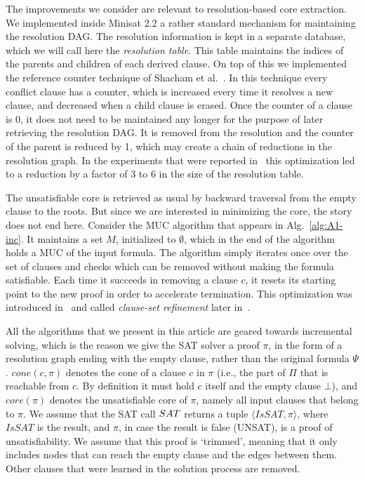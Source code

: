 \documentclass[twoside,11pt]{article}
\renewcommand\square{\bot}
\renewcommand\Pr{\pi}
\begin{document}
The improvements we consider are relevant to resolution-based core extraction. We implemented inside Minisat 2.2 a rather standard mechanism for maintaining the resolution DAG. The resolution information is kept in a separate database, which we will call here the \emph{resolution table}. This table maintains the indices of the parents and children of each derived clause. On top of this we implemented the reference counter technique of Shacham et al.~\cite{SY07}. In this technique every conflict clause has a counter, which is increased every time it resolves a new clause, and decreased when a child clause is erased. Once the counter of a clause is 0, it
does not need to be maintained any longer for the purpose of later retrieving the resolution DAG.
It is removed from the resolution and the counter of the parent is reduced by 1, which may create a chain of reductions in the resolution graph. In the experiments that were reported in~\cite{SY07} this optimization led to a reduction by a factor of 3 to 6 in the size of the resolution table.

The unsatisfiable core is retrieved as usual by backward traversal from the
empty clause to the roots. But since we are interested in minimizing the
core, the story does not end here. Consider the MUC algorithm that appears in Alg.~\ref{alg:A1-inc}. It maintains a set $M$, initialized to $\emptyset$, which in the end of the algorithm holds a MUC of the input formula. The algorithm simply iterates once over the set of clauses and checks which can be removed without making the formula satisfiable. Each time it succeeds in removing a clause $c$, it resets its starting point to the new proof in order to accelerate termination. This optimization was introduced in~\cite{NadelPhd,DHN06} and called \emph{clause-set refinement} later in~\cite{DBLP:journals/aicom/BelovLM12}.

All the algorithms that we present in this article are geared towards incremental solving, which is the reason we give the SAT solver a proof $\Pr$, in the form of a resolution graph ending with the empty clause, rather than the original formula $\Psi$. $cone(c,\Pr)$ denotes the cone of a clause $c$ in $\Pr$ (i.e., the part of $\Pi$ that is reachable from $c$. By definition it must hold $c$ itself and the empty clause $\square$), and $core(\Pr)$ denotes the unsatisfiable core of $\Pr$, namely all input clauses that belong to $\pi$. We assume that the SAT call ${\sc SAT}$ returns a tuple $\langle IsSAT, \Pr\rangle$, where $IsSAT$ is the result, and $\Pr$, in case the result is false (UNSAT), is a proof of unsatisfiability. We assume that this proof is `trimmed', meaning that it only includes nodes that can reach the empty clause and the edges between them. Other clauses that were learned in the solution process are removed.
\end{document}
